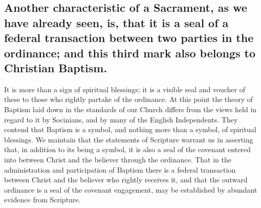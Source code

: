 \documentclass[]{book}
\begin{document}
\hypertarget{another-characteristic-of-a-sacrament-as-we-have-already-seen-is-that-it-is-a-seal-of-a-federal-transaction-between-two-parties-in-the-ordinance-and-this-third-mark-also-belongs-to-christian-baptism.}{%
\subsection{Another characteristic of a Sacrament, as we have already seen, is, that it is a seal of a federal transaction between two parties in the ordinance; and this third mark also belongs to Christian Baptism.}\label{another-characteristic-of-a-sacrament-as-we-have-already-seen-is-that-it-is-a-seal-of-a-federal-transaction-between-two-parties-in-the-ordinance-and-this-third-mark-also-belongs-to-christian-baptism.}}

It is more than a sign of spiritual blessings; it is a visible seal and voucher of these to those who rightly partake of the ordinance. At this point the theory of Baptism laid down in the standards of our Church differs from the views held in regard to it by Socinians, and by many of the English Independents. They contend that Baptism is a symbol, and nothing more than a symbol, of spiritual blessings. We maintain that the statements of Scripture warrant us in asserting that, in addition to its being a symbol, it is also a seal of the covenant entered into between Christ and the believer through the ordinance. That in the administration and participation of Baptism there is a federal transaction between Christ and the believer who rightly receives it, and that the outward ordinance is a seal of the covenant engagement, may be established by abundant evidence from Scripture.
\end{document}
